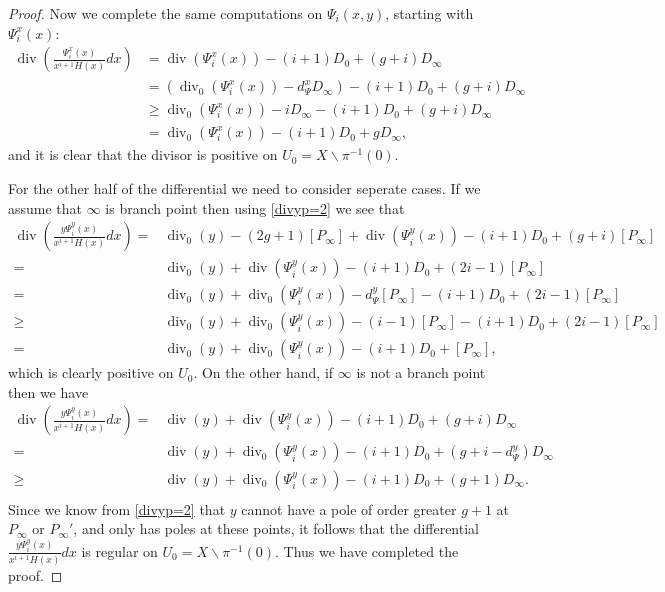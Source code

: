 \documentclass[draft, 11pt]{article} %
\theoremstyle{plain}
\theoremstyle{remark}
\DeclareMathOperator{\di}{div}
\begin{document}
\begin{proof}
Now we complete the same computations on $\Psi_i(x,y)$, starting with $\Psi_i^x(x)$:
\begin{align*}
\di\left( \frac{\Psi_i^x(x) }{x^{i+1}H(x)}dx \right)  & =   \di(\Psi_i^x(x))  - (i+1)D_0 + (g+i)D_\infty \\
& = (\di_0(\Psi_i^x(x)) -d_\Psi^xD_\infty) - (i+1)D_0 + (g+i)D_\infty \\
 & \geq   \di_0(\Psi_i^x(x) ) - iD_\infty - (i+1)D_0 + (g+i)D_\infty \\
 & =   \di_0(\Psi_i^x(x)) - (i+1)D_0 + gD_\infty,
\end{align*}
and it is clear that the divisor is positive on $U_0 = X \backslash \pi^{-1}(0)$.

For the other half of the differential we need to consider seperate cases.
If we assume that $\infty$ is branch point then  using \eqref{divyp=2} we see that
\begin{align*}
\di\left(\frac{y\Psi_i^y(x) }{x^{i+1}H(x)}dx \right)  =  & \di_0(y) - (2g+1)[P_\infty] + \di(\Psi_i^y(x)) - (i+1)D_0 + (g+i)[P_\infty] \\
 =  & \di_0(y) + \di(\Psi_i^y(x)) -(i+1)D_0 + (2i -1)[P_\infty] \\
 = &  \di_0(y) + \di_0(\Psi_i^y(x)) - d_\Psi^y[P_\infty] - (i+1)D_0 + (2i-1)[P_\infty] \\
 \geq &  \di_0(y) + \di_0(\Psi_i^y(x)) -(i-1)[P_\infty] -(i+1)D_0 + (2i-1)[P_\infty] \\
 =   &\di_0(y) + \di_0(\Psi_i^y(x)) -(i+1)D_0 + [P_\infty],
\end{align*}
which is clearly positive on $U_0$.
On the other hand, if $\infty$ is not a branch point then we have
\begin{align*}
\di\left(\frac{y\Psi_i^y(x) }{x^{i+1}H(x)}dx \right)  =  & \di(y) + \di(\Psi_i^y(x)) - (i+1)D_0 + (g+i)D_\infty \\
= & \di(y) + \di_0(\Psi_i^y(x)) - (i+1)D_0 + (g+i - d_\Psi^y)D_\infty \\
\geq & \di(y) + \di_0(\Psi_i^y(x)) - (i+1)D_0 + (g+1)D_\infty. \\
\end{align*}
Since we know from \eqref{divyp=2} that $y$ cannot have a pole of order greater $g+1$ at $P_\infty$ or $P_\infty'$, and only has poles at these points, it follows that the differential $\frac{y\Psi_i^y(x) }{x^{i+1}H(x)}dx$ is regular on $U_0 = X \backslash \pi^{-1}(0)$.
Thus we have completed the proof.


\end{proof}
\end{document}
